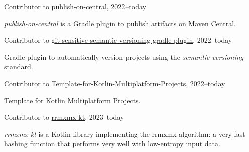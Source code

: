 \documentclass[10pt]{article}
\newenvironment{innerlist}[1][\enskip\textbullet]%
        {\begin{compactitem}[#1]}{\end{compactitem}}
\newcommand{\halfblankline}{\quad\vspace{-0.5\baselineskip}\pagebreak[3]}
\begin{document}
Contributor to \href{https://github.com/DanySK/publish-on-central}{publish-on-central}, 2022--today
\begin{innerlist}
    \item \emph{publish-on-central} is a Gradle plugin to publish artifacts on Maven Central.
\end{innerlist}
\halfblankline

Contributor to \href{https://github.com/DanySK/git-sensitive-semantic-versioning-gradle-plugin}{git-sensitive-semantic-versioning-gradle-plugin}, 2022--today
\begin{innerlist}
    \item Gradle plugin to automatically version projects using the \emph{semantic versioning} standard.
\end{innerlist}
\halfblankline

Contributor to \href{https://github.com/DanySK/Template-for-Kotlin-Multiplatform-Projects}{Template-for-Kotlin-Multiplatform-Projects}, 2022--today
\begin{innerlist}
    \item Template for Kotlin Multiplatform Projects.
\end{innerlist}
\halfblankline

Contributor to \href{https://github.com/DanySK/rrmxmx-kt}{rrmxmx-kt}, 2023--today
\begin{innerlist}
    \item \emph{rrmxmx-kt} is a Kotlin library implementing the rrmxmx algorithm: a very fast hashing function that performs very well with low-entropy input data.
\end{innerlist}
\halfblankline
\end{document}
